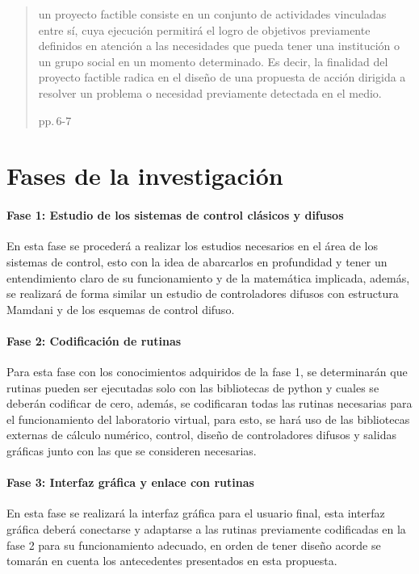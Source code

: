 	\blockquote[pp.$\,$6-7]{un proyecto factible consiste en un conjunto de actividades vinculadas entre sí, cuya ejecución permitirá el logro de objetivos previamente definidos en atención a las necesidades que pueda tener una institución o un grupo social en un momento determinado. Es decir, la finalidad del proyecto factible radica en el diseño de una propuesta de acción dirigida a resolver un problema o necesidad previamente detectada en el medio.}

\section{Fases de la investigación}
	
	\paragraph{Fase 1: Estudio de los sistemas de control clásicos y difusos}
		
		En esta fase se procederá a realizar los estudios necesarios en el área de los sistemas de control, esto con la idea de abarcarlos en profundidad y tener un entendimiento claro de su funcionamiento y de la matemática implicada, además, se realizará de forma similar un estudio de controladores difusos con estructura Mamdani y de los esquemas de control difuso.
		
	\paragraph{Fase 2: Codificación de rutinas}
		
		Para esta fase con los conocimientos adquiridos de la fase 1, se determinarán que rutinas pueden ser ejecutadas solo con las bibliotecas de python y cuales se deberán codificar de cero, además, se codificaran todas las rutinas necesarias para el funcionamiento del laboratorio virtual, para esto, se hará uso de las bibliotecas externas de cálculo numérico, control, diseño de controladores difusos y salidas gráficas junto con las que se consideren necesarias.
		
	\paragraph{Fase 3: Interfaz gráfica y enlace con rutinas}
		
		En esta fase se realizará la interfaz gráfica para el usuario final, esta interfaz gráfica deberá conectarse y adaptarse a las rutinas previamente codificadas en la fase 2 para su funcionamiento adecuado, en orden de tener diseño acorde se tomarán en cuenta los antecedentes presentados en esta propuesta.
		
